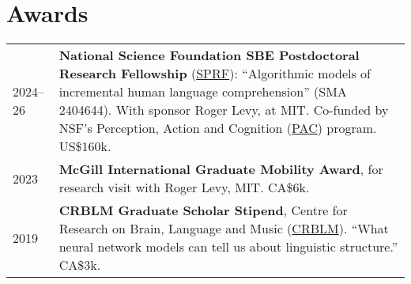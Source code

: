 \documentclass[11pt,a4paper]{article}
\begin{document}

  \section{Awards}
  \begin{longtable}{p{1.7cm}|p{15cm}}
    \textsc{2024--26}&%
      \textbf{National Science Foundation SBE Postdoctoral Research Fellowship} (\href{https://new.nsf.gov/funding/opportunities/sbe-postdoctoral-research-fellowships-sprf}{SPRF}): ``Algorithmic models of incremental human language comprehension''
      (SMA 2404644). 
      With sponsor Roger Levy, at MIT.
      Co-funded by NSF's Perception, Action and Cognition (\href{https://new.nsf.gov/funding/opportunities/perception-action-cognition-pac}{PAC}) program.
      US\$160k.\\
    \textsc{2023}&%
      \textbf{McGill International Graduate Mobility Award},
      for research visit with Roger Levy, MIT\@. CA\$6k.\\
    \textsc{2019}&%
      \textbf{CRBLM Graduate Scholar Stipend}, Centre for Research on Brain, Language
      and Music (\href{https://crblm.ca/}{CRBLM}). ``What neural network models
      can tell us about linguistic structure.'' CA\$3k.\\
  \end{longtable}
\end{document}

